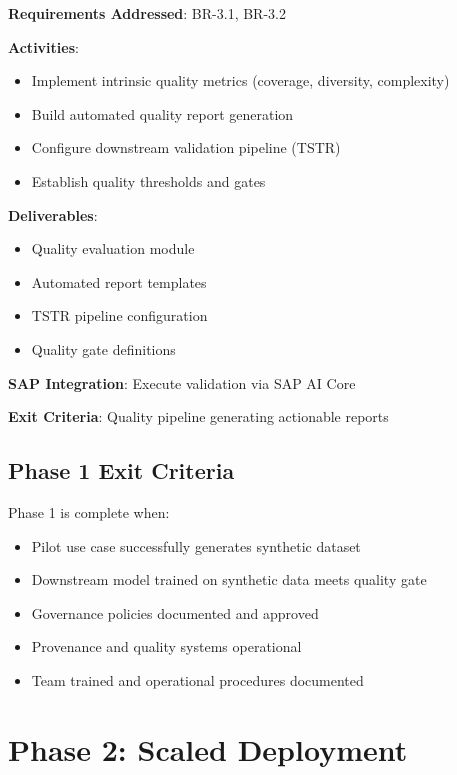 \begin{tcolorbox}[colback=blue!5,colframe=blue!70,title=1.6 Quality Evaluation]
\textbf{Requirements Addressed}: BR-3.1, BR-3.2

\textbf{Activities}:
\begin{itemize}
  \item Implement intrinsic quality metrics (coverage, diversity, complexity)
  \item Build automated quality report generation
  \item Configure downstream validation pipeline (TSTR)
  \item Establish quality thresholds and gates
\end{itemize}

\textbf{Deliverables}:
\begin{itemize}
  \item Quality evaluation module
  \item Automated report templates
  \item TSTR pipeline configuration
  \item Quality gate definitions
\end{itemize}

\textbf{SAP Integration}: Execute validation via SAP AI Core

\textbf{Exit Criteria}: Quality pipeline generating actionable reports
\end{tcolorbox}

\subsection{Phase 1 Exit Criteria}

Phase 1 is complete when:
\begin{itemize}
  \item[\checkmark] Pilot use case successfully generates synthetic dataset
  \item[\checkmark] Downstream model trained on synthetic data meets quality gate
  \item[\checkmark] Governance policies documented and approved
  \item[\checkmark] Provenance and quality systems operational
  \item[\checkmark] Team trained and operational procedures documented
\end{itemize}


\section{Phase 2: Scaled Deployment}

